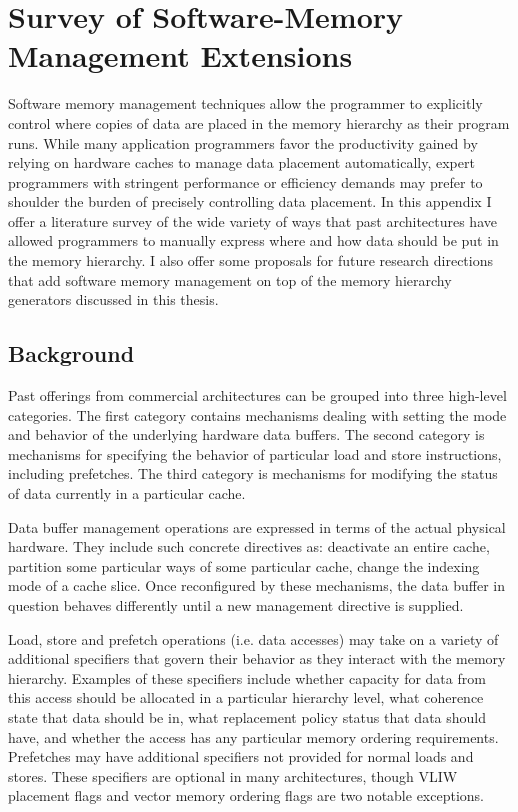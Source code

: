 \chapter{Survey of Software-Memory Management Extensions}
\label{a.swmem}
  
Software memory management techniques allow the programmer to explicitly control
where copies of data are placed in the memory hierarchy as their program runs.
While many application programmers favor the productivity gained by relying on hardware caches to manage data placement automatically,
expert programmers with stringent performance or efficiency demands may prefer to shoulder the burden
of precisely controlling data placement.
In this appendix I offer a literature survey of the wide variety of ways that past architectures have allowed programmers to
manually express where and how data should be put in the memory hierarchy.
I also offer some proposals for future research directions that add software memory management on top of the memory hierarchy generators
discussed in this thesis.

\section{Background}

Past offerings from commercial architectures can be grouped into three high-level categories.
The first category contains mechanisms dealing with setting the mode and behavior of the underlying hardware data buffers.
The second category is mechanisms for specifying the behavior of particular load and store instructions, including prefetches. The third category is mechanisms for modifying the status of data currently in a particular cache. 

Data buffer management operations are expressed in terms of the actual physical hardware. They include such concrete directives as: deactivate an entire cache, partition some particular ways of some particular cache, change the indexing mode of a cache slice. Once reconfigured by these mechanisms, the data buffer in question behaves differently until a new management directive is supplied.

Load, store and prefetch operations (i.e. data accesses) may take on a variety of additional specifiers that govern their behavior as they interact with the memory hierarchy. Examples of these specifiers include whether capacity for data from this access should be allocated in a particular hierarchy level, what coherence state that data should be in, what replacement policy status that data should have, and whether the access has any particular memory ordering requirements. Prefetches may have additional specifiers not provided for normal loads and stores. These specifiers are optional in many architectures, though VLIW placement flags and vector memory ordering flags are two notable exceptions.

